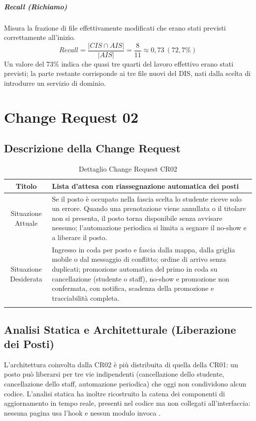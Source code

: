 \documentclass[11pt,a4paper,oneside,openany]{book}
\begin{document}
\paragraph{Recall (Richiamo)}
Misura la frazione di file effettivamente modificati che erano stati previsti
correttamente all'inizio.
\[ \mathit{Recall} = \frac{|\mathit{CIS} \cap \mathit{AIS}|}{|\mathit{AIS}|} = \frac{8}{11} \approx 0{,}73\ (72{,}7\%) \]
Un valore del 73\% indica che quasi tre quarti del lavoro effettivo erano
stati previsti; la parte restante corrisponde ai tre file nuovi del DIS, nati
dalla scelta di introdurre un servizio di dominio.

\chapter{Change Request 02}

\section{Descrizione della Change Request}

{\small
\begin{xltabular}{\linewidth}{SY}
  \toprule
  Titolo & Lista d'attesa con riassegnazione automatica dei posti \\
  \midrule
  Situazione Attuale &
  Se il posto è occupato nella fascia scelta lo studente riceve solo un
  errore. Quando una prenotazione viene annullata o il titolare non si
  presenta, il posto torna disponibile senza avvisare nessuno; l'automazione
  periodica si limita a segnare il no-show e a liberare il posto. \\
  \midrule
  Situazione Desiderata &
  Ingresso in coda per posto e fascia dalla mappa, dalla griglia mobile o dal
  messaggio di conflitto; ordine di arrivo senza duplicati; promozione
  automatica del primo in coda su cancellazione (studente o staff), no-show e
  promozione non confermata, con notifica, scadenza della promozione e
  tracciabilità completa. \\
  \bottomrule
  \caption{Dettaglio Change Request CR02}\label{tab:cr02}\\
\end{xltabular}}

\section{Analisi Statica e Architetturale (Liberazione dei Posti)}

L'architettura coinvolta dalla CR02 è più distribuita di quella della CR01:
un posto può liberarsi per tre vie indipendenti (cancellazione dello studente,
cancellazione dello staff, automazione periodica) che oggi non condividono
alcun codice. L'analisi statica ha inoltre ricostruito la catena dei
componenti di aggiornamento in tempo reale, presenti nel codice ma non
collegati all'interfaccia: nessuna pagina usa l'hook  e
nessun modulo invoca .
\end{document}
